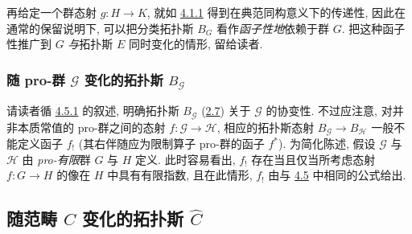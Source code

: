 再给定一个群态射 $g:H\rightarrow K$, 就如 \hyperref[IV.subsubsec4.1.1]{4.1.1} 得到在典范同构意义下的传递性, 因此在通常的保留说明下, 可以把分类拓扑斯 $B_G$ 看作\emph{函子性地}依赖于群 $G$. 把这种函子性推广到 $G$ \emph{与}拓扑斯 $E$ 同时变化的情形, 留给读者.




\subsubsection{随 pro-群 $𝒢$ 变化的拓扑斯 $B_{𝒢}$}

请读者循 \hyperref[IV.subsubsec4.5.1]{4.5.1} 的叙述, 明确拓扑斯 $B_{𝒢}$ (\hyperref[IV.subsec2.7]{2.7}) 关于 $𝒢$ 的协变性. 不过应注意, 对并非本质常值的 pro-群之间的态射 $f:𝒢\rightarrow ℋ$, 相应的拓扑斯态射 $B_{𝒢}\rightarrow B_{ℋ}$ 一般不能定义函子 $f_{!}$ (其右伴随应为限制算子 pro-群的函子 $f^{\ast}$). 为简化陈述, 假设 $𝒢$ 与 $ℋ$ 由 \emph{pro-有限}群 $G$ 与 $H$ 定义. 此时容易看出, $f_{!}$ 存在当且仅当所考虑态射 $f:G\rightarrow H$ 的像在 $H$ 中具有有限指数, 且在\pageoriginale 此情形, $f_{!}$ 由与 \hyperref[IV.subsec4.5]{4.5} 中相同的公式给出.

\subsection{随范畴 $C$ 变化的拓扑斯 $\widehat{C}$}

